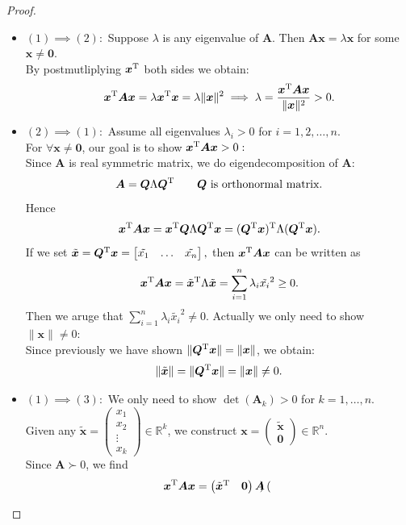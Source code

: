\begin{proof}
\begin{itemize}
\item
$(1)\implies(2):$ Suppose $\lambda$ is any eigenvalue of $\bm A$. Then $\bm{Ax}=\lambda\bm x$ for some $\bm x\ne\bm 0$.\\
By postmutliplying $\bm x^{\mathrm T}$ both sides we obtain:
\[
\bm x^{\mathrm T}\bm A\bm x=\lambda\bm x^{\mathrm T}\bm x=\lambda\|\bm x\|^2
\implies
\lambda=\frac{\bm x^{\mathrm T}\bm A\bm x}{\|\bm x\|^2}>0.
\]
\item
$(2)\implies(1):$ Assume all eigenvalues $\lambda_i>0$ for $i=1,2,\dots,n.$\\
For $\forall\bm x\ne\bm 0$, our goal is to show $\bm x^{\mathrm T}\bm A\bm x>0:$\\
Since $\bm A$ is real symmetric matrix, we do eigendecomposition of $\bm A$:
\[
\bm A=\bm Q\Lambda\bm Q^{\mathrm T}\qquad\text{$\bm Q$ is orthonormal matrix.}
\]
Hence 
\[
\bm x^{\mathrm T}\bm A\bm x=\bm x^{\mathrm T}\bm Q\Lambda\bm Q^{\mathrm T}\bm x=(\bm Q^{\mathrm T}\bm x)^{\mathrm T}\Lambda(\bm Q^{\mathrm T}\bm x).
\]
If we set $\tilde{\bm x}=\bm Q^{\mathrm T}\bm x=\begin{bmatrix}
\tilde{x_1}&\dots&\tilde{x_n}
\end{bmatrix},$ then $\bm x^{\mathrm T}\bm A\bm x$ can be written as
\[
\bm x^{\mathrm T}\bm A\bm x=\tilde{\bm x}^{\mathrm T}\Lambda\tilde{\bm x}=\sum_{i=1}^{n}\lambda_i\tilde{x_i}^2\ge0.
\]
Then we aruge that $\sum_{i=1}^{n}\lambda_i\tilde{x_i}^2\ne0.$ Actually we only need to show $\|\bm x\|\ne0:$\\
Since previously we have shown $\|\bm Q^{\mathrm T}\bm x\|=\|\bm x\|$, we obtain:
\[
\|\tilde{\bm x}\|=\|\bm Q^{\mathrm T}\bm x\|=\|\bm x\|\ne0.
\]
\item
$(1)\implies(3):$ We only need to show $\det(\bm A_k)>0$ for $k=1,\dots,n$.\\
Given any $\tilde{\bm x}=\begin{pmatrix}
x_1\\x_2\\\vdots\\x_k
\end{pmatrix}\in\mathbb{R}^{k}$, we construct $\bm x=\begin{pmatrix}
\tilde{\bm x}\\\bm 0
\end{pmatrix}\in\mathbb{R}^{n}$.\\
Since $\bm A\succ0$, we find
\begin{align*}
\bm x^{\mathrm T}\bm A\bm x&=\begin{pmatrix}
\tilde{\bm x}^{\mathrm T}&\bm 0
\end{pmatrix}\bm A\begin{pmatrix}

\end{pmatrix}
\end{align*}
\end{itemize}
\end{proof}
